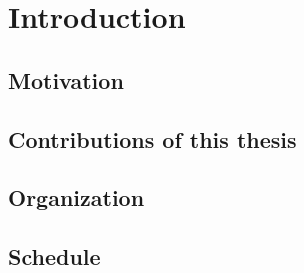 \chapter{Introduction}
\label{ch:intro}

\section{Motivation}
\label{sec:motivation}


\section{Contributions of this thesis}
\label{sec:contributions}


\section{Organization}
\label{sec:organization}

 
\section{Schedule}
\label{sec:schedule}

